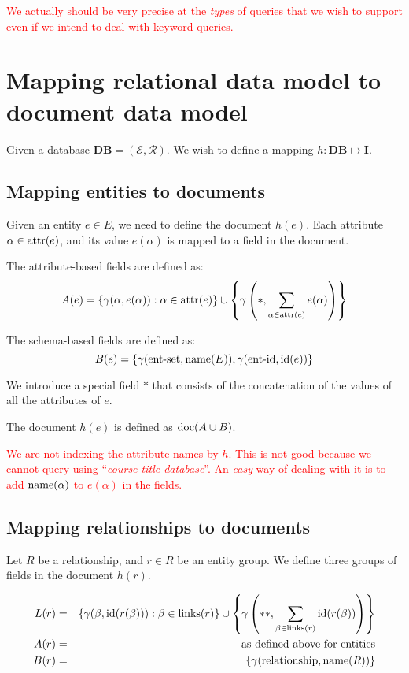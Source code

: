 \documentclass{article}
\begin{document}
\textcolor{red}{We actually should be very precise at the {\em types} of queries
that we wish to support even if we intend to deal with keyword queries.}

\section{Mapping relational data model to document data model}

Given a database $\mathbf{DB} = (\mathcal{E}, \mathcal{R})$.  We wish to define
a mapping $h:\mathbf{DB}\mapsto \mathbf{I}$.

\subsection{Mapping entities to documents}

Given an entity $e\in E$, we need to define the document $h(e)$.  Each attribute
$\alpha\in\operatorname{attr}(e)$, and its value $e(\alpha)$ is mapped to a field in the
document.

The attribute-based fields are defined as:
$$A(e) = \{\gamma(\alpha, e(\alpha)) : \alpha\in\operatorname{attr}(e)\}
 \cup \left\{\gamma\left(*,
\sum_{\alpha\in\operatorname{attr}(e)}e(\alpha)\right)\right\}$$

The schema-based fields are defined as:
$$B(e) = \{\gamma(\operatorname{ent-set}, \operatorname{name}(E)),
           \gamma(\operatorname{ent-id}, \operatorname{id}(e))\}$$

We introduce a special field $*$ that consists of the concatenation of the
values of all the attributes of $e$.

The document $h(e)$ is defined as 
$\operatorname{doc}(A\cup B)$.

\textcolor{red}{We are not indexing the attribute names by $h$.  This is not
good because we cannot query using ``{\em course title database}''.  An {\em
easy} way of dealing with it is to add $\operatorname{name}(\alpha)$ to $e(\alpha)$ in the
fields.}

\subsection{Mapping relationships to documents}

Let $R$ be a relationship, and $r\in R$ be an entity group.  We define three
groups of fields in the document $h(r)$.

\begin{eqnarray*}
L(r) &=& \{\gamma(\beta,\F{id}(r(\beta))) : \beta\in\F{links}(r)\} \cup
     \left\{
        \gamma\left(**,\sum_{\beta\in\F{links}(r)}\F{id}(r(\beta))\right)
      \right\} \\
A(r) &=& \makebox{ as defined above for entities} \\
B(r) &=& \{\gamma(\F{relationship}, \F{name}(R))\}
\end{eqnarray*}
\end{document}
